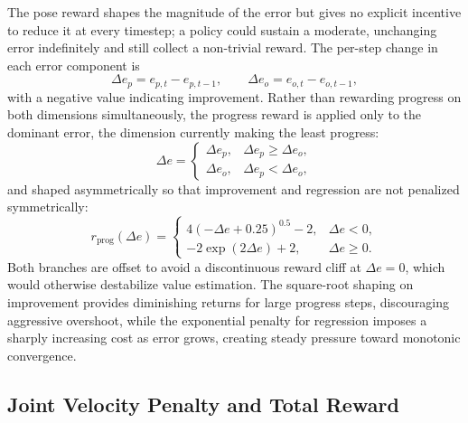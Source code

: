 The pose reward shapes the magnitude of the error but gives no explicit incentive to reduce it at
every timestep; a policy could sustain a moderate, unchanging error indefinitely and still collect a
non-trivial reward. The per-step change in each error component is
\begin{equation}
\Delta e_p = e_{p,t} - e_{p,t-1}, \qquad \Delta e_o = e_{o,t} - e_{o,t-1},
\label{eq:dikppo_delta}
\end{equation}
with a negative value indicating improvement. Rather than rewarding progress on both dimensions
simultaneously, the progress reward is applied only to the dominant error, the dimension currently
making the least progress:
\begin{equation}
\Delta e =
\begin{cases}
\Delta e_p, & \Delta e_p \geq \Delta e_o, \\
\Delta e_o, & \Delta e_p < \Delta e_o,
\end{cases}
\label{eq:dikppo_dominant}
\end{equation}
and shaped asymmetrically so that improvement and regression are not penalized symmetrically:
\begin{equation}
r_{\text{prog}}(\Delta e) =
\begin{cases}
4(-\Delta e + 0.25)^{0.5} - 2, & \Delta e < 0, \\
-2 \exp(2 \Delta e) + 2, & \Delta e \geq 0.
\end{cases}
\label{eq:dikppo_progress}
\end{equation}
Both branches are offset to avoid a discontinuous reward cliff at $\Delta e = 0$, which would
otherwise destabilize value estimation. The square-root shaping on improvement provides diminishing
returns for large progress steps, discouraging aggressive overshoot, while the exponential penalty
for regression imposes a sharply increasing cost as error grows, creating steady pressure toward
monotonic convergence.

\subsection{Joint Velocity Penalty and Total Reward}\label{subsec:dikppo_energy}

